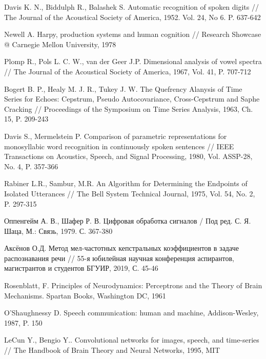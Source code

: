 \begin{thebibliography}{1}
Davis K. N., Biddulph R., Balashek S. Automatic recognition of spoken digits // The Journal of the Acoustical Society of America, 1952. Vol. 24, No 6. P. 637-642 

Newell A. Harpy, production systems and human cognition // Research Showcase @ Carnegie Mellon University, 1978

Plomp R., Pols L. C. W., van der Geer J.P. Dimensional analysis of vowel spectra // The Journal of the Acoustical Society of America, 1967, Vol. 41, P. 707-712 

Bogert B. P., Healy M. J. R., Tukey J. W. The Quefrency Alanysis of Time Series for Echoes: Cepstrum, Pseudo Autocovariance, Cross-Cepstrum and Saphe Cracking // Proceedings of the Symposium on Time Series Analysis, 1963, Ch. 15, P. 209-243

Davis S., Mermelstein P. Comparison of parametric representations for monosyllabic word recognition in continuously spoken sentences // IEEE Transactions on Acoustics, Speech, and Signal Processing, 1980, Vol. ASSP-28, No. 4, P. 357-366

Rabiner L.R., Sambur, M.R. An Algorithm for Determining the Endpoints of Isolated Utterances // The Bell System Technical Journal, 1975, Vol. 54, No. 2, P. 297-315

Оппенгейм А. В., Шафер Р. В. Цифровая обработка сигналов / Под ред. С. Я. Шаца, М.: Связь, 1979. С. 367-380

Аксёнов О.Д. Метод мел-частотных кепстральных коэффициентов в задаче распознавания речи // 55-я юбилейная научная конференция аспирантов, магистрантов и студентов БГУИР, 2019, С. 45-46

Rosenblatt, F. Principles of Neurodynamics: Perceptrons and the Theory of Brain Mechanisms. Spartan Books, Washington DC, 1961

O'Shaughnessy D. Speech communication: human and machine, Addison-Wesley, 1987, P. 150

LeCun Y., Bengio Y.. Convolutional networks for images, speech, and time-series // The Handbook of Brain Theory and Neural Networks, 1995, MIT 
\end{thebibliography}
